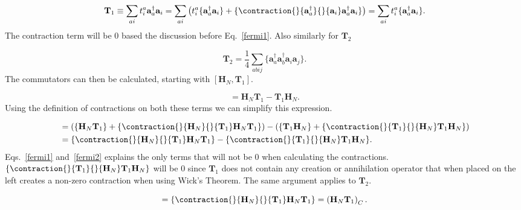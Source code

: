 \documentclass[graybox,sectrefs,envcountresetchap,open=right]{svmonodo}
\begin{document}
\begin{equation}
\mathbf{T}_1 \equiv \sum_{ai} t_i^a \mathbf{a}^{\dagger}_a \mathbf{a}_i = \sum_{ai} \left( t_i^a \{\mathbf{a}^{\dagger}_a \mathbf{a}_i\} + \{
\contraction{}{\mathbf{a}^{\dagger}_a}{}{\mathbf{a}_i}
\mathbf{a}^{\dagger}_a \mathbf{a}_i
\} \right) = \sum_{ai} t_i^a \{\mathbf{a}^{\dagger}_a \mathbf{a}_i\} .
\end{equation} 
The contraction term will be 0 based the discussion before Eq.~\ref{fermi1}. Also similarly for $\mathbf{T}_2$

\begin{equation}
\mathbf{T}_2 = \frac{1}{4} \sum_{abij} \{
\mathbf{a}^{\dagger}_a \mathbf{a}^{\dagger}_b
\mathbf{a}_i \mathbf{a}_j \} .
\end{equation} 
The commutators can then be calculated, starting with $[\mathbf{H}_N, \mathbf{T}_1]$.

\begin{equation}
[\mathbf{H}_N, \mathbf{T}_1] = \mathbf{H}_N \mathbf{T}_1 - \mathbf{T}_1 \mathbf{H}_N .
\end{equation} 
Using the definition of contractions on both these terms we can simplify this expression.

\begin{align}
[\mathbf{H}_N, \mathbf{T}_1] & =
\left( \{\mathbf{H}_N\mathbf{T}_1\} + \{
\contraction{}{\mathbf{H}_N}{}{\mathbf{T}_1}
\mathbf{H}_N\mathbf{T}_1\} \right) - \left(\{\mathbf{T}_1\mathbf{H}_N\} + \{
\contraction{}{\mathbf{T}_1}{}{\mathbf{H}_N}
\mathbf{T}_1\mathbf{H}_N\} \right) \nonumber \\ &
= \{
\contraction{}{\mathbf{H}_N}{}{\mathbf{T}_1}
\mathbf{H}_N\mathbf{T}_1\}
- \{
\contraction{}{\mathbf{T}_1}{}{\mathbf{H}_N}
\mathbf{T}_1\mathbf{H}_N\} .
\end{align} 
Eqs.~\ref{fermi1} and~\ref{fermi2} explains the only terms that will not be 0 when calculating the contractions. $\{ \contraction{}{\mathbf{T}_1}{}{\mathbf{H}_N}
\mathbf{T}_1\mathbf{H}_N\}$ will be 0 since $\mathbf{T}_1$ does not contain any creation or annihilation operator that when placed on the left creates a non-zero contraction when using Wick's Theorem. The same argument applies to $\mathbf{T}_2$. 

\begin{equation}
[\mathbf{H}_N, \mathbf{T}_1] = 
\{
\contraction{}{\mathbf{H}_N}{}{\mathbf{T}_1}
\mathbf{H}_N\mathbf{T}_1\} 
= \left( \mathbf{H}_N \mathbf{T}_1 \right)_C.
\end{equation} 
\end{document}
